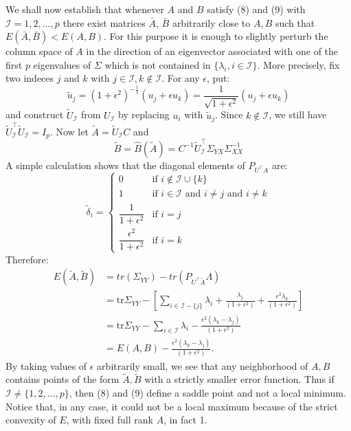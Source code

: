 We shall now establish that whenever $A$ and $B$ satisfy (8) and (9) with $\mathcal{I} = {1,  2, \dots, p}$ there exist matrices $\bar{A}$, $\bar{B}$ arbitrarily close to $A,B$ such that $E(\bar{A},\bar{B}) < E(A,B)$. For this purpose it is enough to slightly perturb the column space of $A$ in the direction of an eigenvector associated with one of the first $p$ eigenvalues of $\Sigma$ which is not contained in $\{\lambda_i, i \in \mathcal{I}\}$. More precisely, fix two indeces $j$ and $k$ with $j \in \mathcal{I}, k \not\in \mathcal{I}$. For any $\epsilon$, put:
\[
    \tilde{u}_j = (1+\epsilon^2)^{-\frac{1}{2}}(u_j + \epsilon u_k) = \dfrac{1}{\sqrt{1+\epsilon^2}}(u_j + \epsilon u_k) 
\]
and construct $\tilde{U}_\mathcal{I}$ from $U_\mathcal{I}$ by replacing $u_i$ with $\tilde{u}_j$. Since $k \not\in \mathcal{I}$, we still have $\tilde{U}^\intercal_\mathcal{I} \tilde{U}_\mathcal{I} = I_p$. Now let $\tilde{A} = \tilde{U}_\mathcal{I} C$ and
\[
    \tilde{B} = \hat{B}(\tilde{A}) = C^{-1}\tilde{U}^\intercal_\mathcal{I} \Sigma_{YX}\Sigma_{XX}^{-1}    
\]
A simple calculation shows that the diagonal elements of $P_{U^\intercal A}$ are:
\[
    \tilde{\delta}_i = 
    \begin{cases}
        0 & \text{if } i \not \in \mathcal{I} \cup \{k\}\\
        1 & \text{if } i \in \mathcal{I} \text{ and } i \neq j \text{ and } i \neq k\\
        \dfrac{1}{1+\epsilon^2} & \text{if } i = j\\
        \dfrac{\epsilon^2}{1 + \epsilon^2} &\text{if } i = k
    \end{cases}    
\]
Therefore:
\[
    \begin{split}
        E(\tilde{A},\tilde{B}) &= tr(\Sigma_{YY}) - tr(P_{U^\intercal \tilde{A}}\Lambda)\\
        &= \text{tr} \Sigma_{YY} - \left[\sum_{i \in \mathcal{I} - \{j\}} \lambda_i + \frac{\lambda_j}{(1 + \epsilon^2)} + \frac{\epsilon^2 \lambda_k}{(1 + \epsilon^2)}\right]\\
        &= \text{tr} \Sigma_{YY} - \sum_{i \in \mathcal{I}} \lambda_i - \frac{\epsilon^2 (\lambda_k - \lambda_j)}{(1 + \epsilon^2)}\\
        &= E(A, B) - \frac{\epsilon^2 (\lambda_k - \lambda_j)}{(1 + \epsilon^2)}.
    \end{split}    
\]
By taking values of $\epsilon$ arbitrarily small, we see that any neighborhood of $A,B$ contains points of the form $\tilde{A},\tilde{B}$ with a strictly smaller error function. Thus if $\mathcal{I} \neq \{1,2,\dots,p\}$, then (8) and (9) define a saddle point and not a local minimum. Notice that, in any case, it could not be a local maximum because of the strict convexity of $E$, with fixed full rank $A$, in fact 1.


